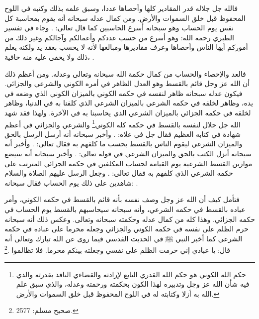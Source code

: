 فالله جل جلاله قدر المقادير كلها وأحصاها عددا، وسبق علمه بذلك وكتبه في اللوح المحفوظ قبل خلق السموات والأرض. ومن كمال عدله سبحانه أنه يقوم بمحاسبة كل نفس يوم الحساب وهو سبحانه أسرع الحاسبين كما قال تعالى: \quranayah*[6][62]{\footnotesize \surahname*[6]}. وجاء في تفسير الطبري رحمه الله: وهو أسرع من حسب عددكم وأعمالكم وآجالكم وغير ذلك من أموركم أيها الناس وأحصاها وعرف مقاديرها ومبالغها لأنه لا يحسب بعقد يد ولكنه يعلم ذلك ولا يخفى عليه منه خافية، \quranayah*[34][3][13]{\footnotesize \surahname*[34]} \href{https://shamela.ws/book/7798/6327#p1}{\faExternalLink} \cite{tafsir_Tabari}.

فالعد والإحصاء والحساب من كمال حكمة الله سبحانه وتعالى وعدله. ومن أعظم ذلك أن الله عز وجل قائم بالقسط وهو العدل الظاهر في أمره الكوني والشرعي والجزائي. فيكون عدله سبحانه ظاهر لنفسه في حكمه الكوني بالميزان الكوني الذي وضعه في يده، وظاهر لخلقه في حكمه الشرعي بالميزان الشرعي الذي كلفنا به في الدنيا، وظاهر لخلقه في حكمه الجزائي بالميزان الشرعي الذي يحاسبنا به في الآخرة. ولهذا فقد شهد الله جل جلال لنفسه بالقسط في حكمه كله الكوني\footnote{حكم الله الكوني هو حكم الله القدري التابع لإرادته والقضاءي النافذ بقدرته والذي فيه شأن الله عز وجل وتدبيره لهذا الكون بحكمته ورحمته وعدله، والذي سبق علم الله به أزلا وكتابته له في اللوح المحفوظ قبل خلق السموات والأرض.} والشرعي والجزائي في أعظم شهادة في كتابه العظيم فقال جل في علاه: \quranayah*[3][18]{\footnotesize \surahname*[3]}. وأخبر سبحانه أنه أرسل الرسل بالحق والميزان الشرعي ليقوم الناس بالقسط بحسب ما كلفهم به فقال تعالى: \quranayah*[57][25][1-11]{\footnotesize (\surahname*[57])}. وأخبر أنه سبحانه أنزل الكتب بالحق والميزان الشرعي في قوله تعالى: \quranayah*[42][17]{\footnotesize (\surahname*[42])}. وأخبر سبحانه أنه سيضع موازين القسط الشرعية يوم القيامة لحساب المكلفين في حكمه الجزائي المترتب على حكمه الشرعي الذي كلفهم به فقال تعالى: \quranayah*[21][47]{\footnotesize \surahname*[21]}. وجعل الرسل عليهم الصلاة والسلام شاهدين على ذلك يوم الحساب فقال سبحانه: \quranayah*[10][47]{\footnotesize \surahname*[10]}.

فتأمل كيف أن الله عز وجل وصف نفسه بأنه قائم بالقسط في حكمه الكوني، وأمر عباده بالقسط في حكمه الشرعي، وأنه سبحانه سيحاسبهم بالقسط يوم الحساب في حكمه الجزائي. وهذا كله من كمال عدله وحكمته سبحانه وتعالى. وعكس ذلك أنه سبحانه حرم الظلم على نفسه في حكمه الكوني والجزائي وجعله محرما على عباده في حكمه الشرعي كما أخبر النبي ﷺ في الحديث القدسي فيما روى عن الله تبارك وتعالى أنه قال: يا عبادي إني حرمت الظلم على نفسي وجعلته بينكم محرما. فلا تظالموا \href{https://shamela.ws/book/1727/6507#p3}{\faExternalLink} \cite{muslim}.\footnote{صحيح مسلم: 2577.}

